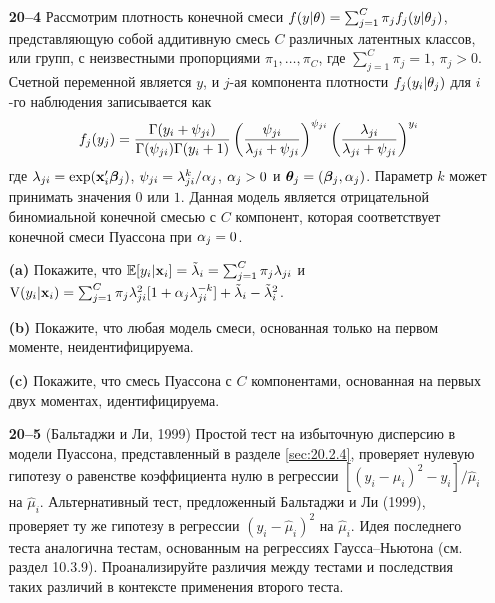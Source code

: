 \begin{itemize}
    \item[\textbf{20--4}]
Рассмотрим плотность конечной смеси $f(y|\theta) = \sum^{C}_{j = 1} \pi_j f_j (y|\theta_j)$, представляющую собой аддитивную смесь $C$ различных латентных классов, или групп, с неизвестными пропорциями $\pi_1, \ldots , \pi_C$, где $\sum^{C}_{j = 1} \pi_j = 1$, $\pi_j > 0$. Счетной переменной является $y$, и $j$-ая компонента плотности $f_j(y_i|\theta_j)$ для $i$-го наблюдения записывается как
        $$f_j(y_j) = \frac{\Gamma(y_i + \psi_{ji})}{\Gamma(\psi_{ji})\Gamma(y_i + 1)} \left( \frac{\psi_{ji}}{\lambda_{ji} + \psi_{ji}} \right)^{\psi_{ji}} \left( \frac{\lambda_{ji}}{\lambda_{ji} + \psi_{ji}} \right)^{y_{i}}$$
где $\lambda_{ji} = \exp(\mathbf{x}_i'\bm{\beta}_j)$, $\psi_{ji} = \lambda^k_{ji} / \alpha_j$, $\alpha_j > 0$ и $\bm{\theta}_j = (\bm{\beta}_j, \alpha_j)$. Параметр $k$ может принимать значения $0$ или $1$. Данная модель является отрицательной биномиальной конечной смесью с $C$ компонент, которая соответствует конечной смеси Пуассона при $\alpha_j = 0$.
        \item[\textbf{(a)}]
Покажите, что $\mathbb{E}[y_i|\mathbf{x}_i] = \tilde{\lambda}_i = \sum^{C}_{j = 1} \pi_j \lambda_{ji}$ и $\mathrm{V}(y_i|\mathbf{x}_i) = \sum^{C}_{j = 1} \pi_j \lambda^2_{ji} [1 + \alpha_j \lambda^{-k}_{ji}] + \tilde{\lambda}_i - \tilde{\lambda}_i^2$.
        \item[\textbf{(b)}]
Покажите, что любая модель смеси, основанная только на первом моменте, неидентифицируема.
        \item[\textbf{(c)}]
Покажите, что смесь Пуассона с $C$ компонентами, основанная на первых двух моментах, идентифицируема.

    \item[\textbf{20--5}]
(Бальтаджи и Ли, 1999) Простой тест на избыточную дисперсию в модели Пуассона, представленный в разделе \ref{sec:20.2.4}, проверяет нулевую гипотезу о равенстве коэффициента нулю в регрессии $[(y_i - \hat{\mu}_i)^2 - y_i] / \hat{\mu}_i$ на $\hat{\mu}_i$. Альтернативный тест, предложенный Бальтаджи и Ли (1999), проверяет ту же гипотезу в регрессии $(y_i - \hat{\mu}_i)^2$ на $\hat{\mu}_i$. Идея последнего теста аналогична тестам, основанным на регрессиях Гаусса--Ньютона (см. раздел 10.3.9). Проанализируйте различия между тестами и последствия таких различий в контексте применения второго теста.


\end{itemize}
